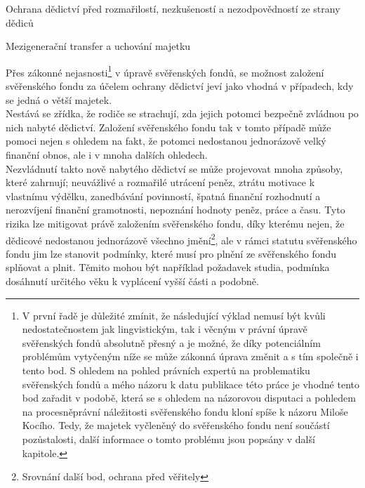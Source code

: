 \documentclass{article}
\begin{document}
 \begin{enumerate}
 {\Large\item Ochrana dědictví před rozmařilostí, nezkušeností a nezodpovědností ze strany dědiců}
 \item[1.] Mezigenerační transfer a uchování majetku
 \end{enumerate}

 
 Přes zákonné nejasnosti\footnote{ V první řadě je důležité zmínit, že následující výklad nemusí být kvůli nedostatečnostem jak lingvistickým, tak i věcným v právní úpravě svěřenských fondů absolutně přesný a je možné, že díky potenciálním problémům vytyčeným níže se může zákonná úprava změnit a s tím společně i tento bod. S ohledem na pohled právních expertů na problematiku svěřenských fondů a mého názoru k datu publikace této práce je vhodné tento bod zařadit v podobě, která se s ohledem na názorovou disputaci a pohledem na procesněprávní náležitosti svěřenského fondu kloní spíše k názoru Miloše Kocího. Tedy, že majetek vyčleněný do svěřenského fondu není součástí pozůstalosti, další informace o tomto problému jsou popsány v další kapitole.} v úpravě svěřenských fondů, se možnost založení svěřenského fondu za účelem ochrany dědictví jeví jako vhodná v případech, kdy se jedná o větší majetek.\\
 
 Nestává se zřídka, že rodiče se strachují, zda jejich potomci bezpečně zvládnou po nich nabyté dědictví. Založení svěřenského fondu tak v tomto případě může pomoci nejen s ohledem na fakt, že potomci nedostanou jednorázově velký finanční obnos, ale i v mnoha dalších ohledech.\\
 
 Nezvládnutí takto nově nabytého dědictví se může projevovat mnoha způsoby, které zahrnují; neuvážlivé a rozmařilé utrácení peněz, ztrátu motivace k vlastnímu výdělku, zanedbávání povinností, špatná finanční rozhodnutí a nerozvíjení finanční gramotnosti, nepoznání hodnoty peněz, práce a času. Tyto rizika lze mitigovat právě založením svěřenského fondu, díky kterému nejen, že dědicové nedostanou jednorázově všechno jmění\footnote{Srovnání další bod, ochrana před věřitely}, ale v rámci statutu svěřenského fondu jim lze stanovit podmínky, které musí pro plnění ze svěřenského fondu splňovat a plnit. Těmito mohou být například požadavek studia, podmínka dosáhnutí určitého věku k vyplácení vyšší části a podobně.\\
 
\end{document}

